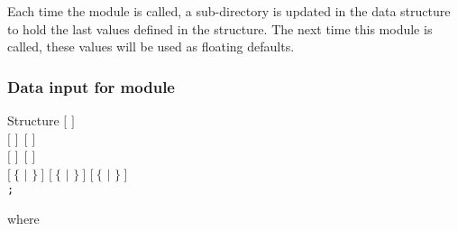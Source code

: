 Each time the  module is called, a sub-directory is updated in the
 data structure to hold the last values defined in the
 structure. The next time this module is called,
these values will be used as floating defaults.

\subsubsection{Data input for module }\label{sect:desctone}

\begin{DataStructure}{Structure }
$[$   $]$ \\
$[$    $]~~[$    $]$ \\
$[$   $]~~[$    $]$  \\
$[~\{$  $|$  $\}~]$
$[~\{$  $|$  $\}~]$
$[~\{$  $|$  $\}~]$ \\
{\tt ;}
\end{DataStructure}

\noindent 
where


